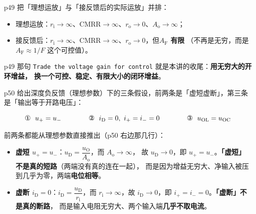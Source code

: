 \documentclass[11pt]{ctexart}
\begin{document}


p49 把「理想运放」与「接反馈后的实际运放」并排：

\begin{itemize}
\item 理想运放：$r_{\mathrm{i}}\to\infty$、CMRR$\to\infty$、$r_{\mathrm{o}}\to0$、$A_{\mathrm{o}}\to\infty$；
\item 接反馈后：$r_{\mathrm{i}}\to\infty$、CMRR$\to\infty$、$r_{\mathrm{o}}\to0$，但\textbf{$A_{\mathrm{F}}$ 有限}
（不再是无穷，而是 $A_{\mathrm{F}}\approx1/F$ 这个可控值）。
\end{itemize}

p49 那句 \texttt{Trade the voltage gain for control} 就是本讲的收尾：\textbf{用无穷大的开环增益，
换一个可控、稳定、有限大小的闭环增益}。


p50 给出深度负反馈（理想参数）下的三条假设，前两条是「虚短虚断」，第三条是「输出等于开路电压」：

\[
\text{\ding{172}}\ \ u_+ = u_-\qquad\qquad
\text{\ding{173}}\ \ i_{\mathrm{D}}=0,\ i_+=i_-=0\qquad\qquad
\text{\ding{174}}\ \ u_{\mathrm{OL}}=u_{\mathrm{OC}}
\]

前两条都能从理想参数直接推出（p50 右边那几行）：

\begin{itemize}
\item \textbf{虚短 $u_+=u_-$}：$u_{\mathrm{D}}=\dfrac{u_{\mathrm{O}}}{A_{\mathrm{o}}}$，而 $A_{\mathrm{o}}\to\infty$，
故 $u_{\mathrm{D}}\to0$，即 $u_+=u_-$。\textbf{「虚短」不是真的短路}（两端没有真的连在一起），
而是因为增益无穷大、净输入被压到几乎为零，两端\textbf{电位相等}。
\item \textbf{虚断 $i_{\mathrm{D}}=0$}：$i_{\mathrm{D}}=\dfrac{u_{\mathrm{D}}}{r_{\mathrm{i}}}$，而
$r_{\mathrm{i}}\to\infty$，故 $i_{\mathrm{D}}\to0$，即 $i_+=i_-=0$。\textbf{「虚断」不是真的断路}，
而是输入电阻无穷大、两个输入端\textbf{几乎不取电流}。
\end{itemize}

\end{document}
